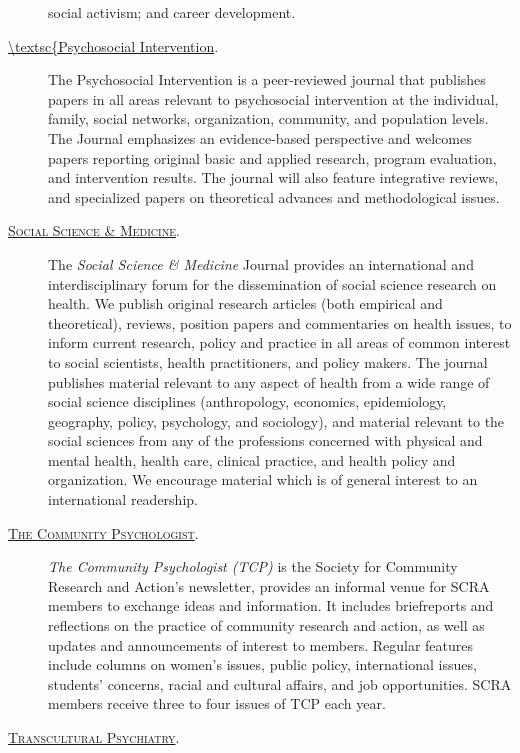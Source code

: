 \documentclass[]{tufte-handout}
\begin{document}
\begin{description}
social activism; and career development.
\item[\href{http://psychosocial-intervention.elsevier.es/en/vol-23-num-01/sumario/13018163/\#.U1p7nOZdXTM}{\textbackslash{}textsc\{Psychosocial
Intervention}.]
The Psychosocial Intervention is a peer-reviewed journal that publishes
papers in all areas relevant to psychosocial intervention at the
individual, family, social networks, organization, community, and
population levels. The Journal emphasizes an evidence-based perspective
and welcomes papers reporting original basic and applied research,
program evaluation, and intervention results. The journal will also
feature integrative reviews, and specialized papers on theoretical
advances and methodological issues.
\item[\href{http://www.journals.elsevier.com/social-science-and-medicine/}{\textsc{Social Science \& Medicine}}.]
The \emph{Social Science \& Medicine} Journal provides an international
and interdisciplinary forum for the dissemination of social science
research on health. We publish original research articles (both
empirical and theoretical), reviews, position papers and commentaries on
health issues, to inform current research, policy and practice in all
areas of common interest to social scientists, health practitioners, and
policy makers. The journal publishes material relevant to any aspect of
health from a wide range of social science disciplines (anthropology,
economics, epidemiology, geography, policy, psychology, and sociology),
and material relevant to the social sciences from any of the professions
concerned with physical and mental health, health care, clinical
practice, and health policy and organization. We encourage material
which is of general interest to an international readership.
\item[\href{http://www.scra27.org/publications/tcp/}{\textsc{The Community Psychologist}}.]
\emph{The Community Psychologist (TCP)} is the Society for Community
Research and Action's newsletter, provides an informal venue for SCRA
members to exchange ideas and information. It includes briefreports and
reflections on the practice of community research and action, as well as
updates and announcements of interest to members. Regular features
include columns on women's issues, public policy, international issues,
students' concerns, racial and cultural affairs, and job opportunities.
SCRA members receive three to four issues of TCP each year.
\item[\href{http://tps.sagepub.com/}{\textsc{Transcultural Psychiatry}}.]

\end{description}
\end{document}
